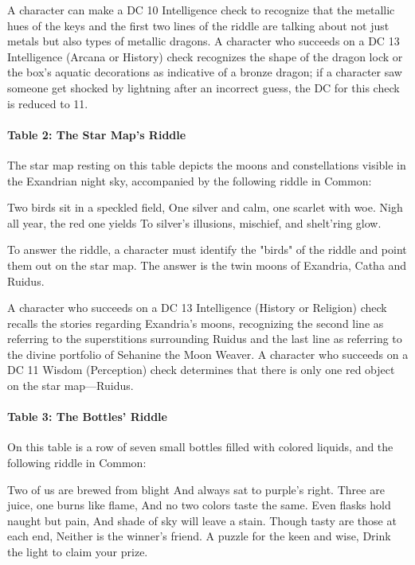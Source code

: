 \documentclass[letterpaper, 11pt, bg=full, twocolumn]{dndbook}
\begin{document}
A character can make a DC 10 Intelligence check to recognize that the metallic hues of the keys and the first two lines of the riddle are talking about not just metals but also types of metallic dragons. A character who succeeds on a DC 13 Intelligence (Arcana or History) check recognizes the shape of the dragon lock or the box's aquatic decorations as indicative of a bronze dragon; if a character saw someone get shocked by lightning after an incorrect guess, the DC for this check is reduced to 11.

\paragraph{Table 2: The Star Map's Riddle}

The star map resting on this table depicts the moons and constellations visible in the Exandrian night sky, accompanied by the following riddle in Common:

\begin{DndReadAloud}
Two birds sit in a speckled field, One silver and calm, one scarlet with woe. Nigh all year, the red one yields To silver's illusions, mischief, and shelt'ring glow.
\end{DndReadAloud}

To answer the riddle, a character must identify the "birds" of the riddle and point them out on the star map. The answer is the twin moons of Exandria, Catha and Ruidus.

A character who succeeds on a DC 13 Intelligence (History or Religion) check recalls the stories regarding Exandria's moons, recognizing the second line as referring to the superstitions surrounding Ruidus and the last line as referring to the divine portfolio of Sehanine the Moon Weaver. A character who succeeds on a DC 11 Wisdom (Perception) check determines that there is only one red object on the star map---Ruidus.

\paragraph{Table 3: The Bottles' Riddle}

On this table is a row of seven small bottles filled with colored liquids, and the following riddle in Common:

\begin{DndReadAloud}
Two of us are brewed from blight And always sat to purple's right. Three are juice, one burns like flame, And no two colors taste the same. Even flasks hold naught but pain, And shade of sky will leave a stain. Though tasty are those at each end, Neither is the winner's friend. A puzzle for the keen and wise, Drink the light to claim your prize.
\end{DndReadAloud}
\end{document}
